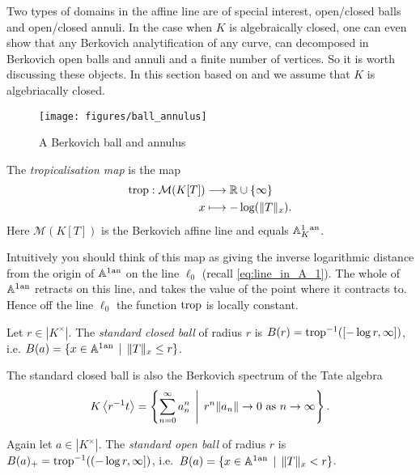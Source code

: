 Two types of domains in the affine line are of special interest, open/closed balls and open/closed annuli. 
In the case when $K$ is algebraically closed, one can even show that any Berkovich analytification of any curve, can decomposed in Berkovich open balls and annuli and a finite number of vertices. 
So it is worth discussing these objects. 
In this section based on \cite[sec.\ 2]{bakerStructureNonarchimedeanAnalytic2013} and we assume that $K$ is algebriacally closed. 
\begin{figure}[h]
	\centering
	\texttt{[image: figures/ball\_annulus]}
	\caption{A Berkovich ball and annulus}
	\label{fig:ball_annulus}
\end{figure}
\begin{definition}
	The \emph{tropicalisation map} is the map 
	\begin{align*}
		\operatorname{trop} :  \mathcal{M} (K[T]) &\longrightarrow \mathbb{R} \cup \{\infty\}  \\
		x &\longmapsto -\log( \|T\|_x)
	.\end{align*}
	Here $\mathcal{M} (K[T])$ is the Berkovich affine line and equals $\mathbb{A}^{1}_K{}^{\text{an}}$. 
\end{definition}
Intuitively you should think of this map as giving the inverse logarithmic distance from the origin of $\mathbb{A}^{1}{}^{\text{an}}$ on the line $\ell_0$ (recall \cref{eq:line_in_A_1}).  
The whole of $\mathbb{A}^{1}{}^{\text{an}} $ retracts on this line, and takes the value of the point where it contracts to. Hence off the line $\ell_0$ the function $\operatorname{trop}$ is locally constant. 



\begin{definition}
	Let $r \in |K^{\times }|$. The \emph{standard closed ball} of radius $r$ is $B(r) = \operatorname{trop}^{-1}([-\log r, \infty])$, i.e. $B(a) = \{x \in \aff^{1}\an \st \|T\|_x \le r\} $. 
\end{definition}
The standard closed ball is also the Berkovich spectrum of the Tate algebra \[
K\left<r^{-1}t \right> = \left\{\sum_{n = 0}^{\infty} a_n ^{n} \st r ^{n} \|a_n\| \to 0 \text{ as } n \to \infty \right\} 
.\] 
\begin{definition}
	Again let $a \in |K^{\times }|$. 
	The \emph{standard open ball} of radius $r$ is $B(a)_+ = \operatorname{trop}^{-1}((-\log r, \infty])$, i.e.\ $B(a) = \{x \in \aff^{1}\an \st \|T\|_x <  r\} $.
\end{definition}

